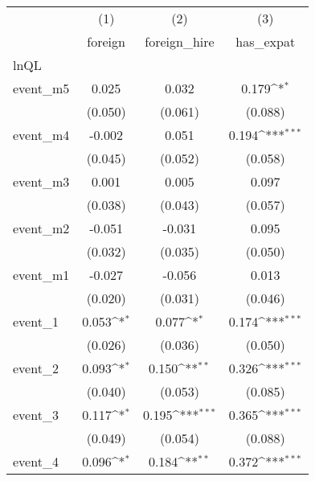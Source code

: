 {
\def\sym#1{\ifmmode^{#1}\else\(^{#1}\)\fi}
\begin{tabular}{l*{3}{c}}
\hline\hline
            &\multicolumn{1}{c}{(1)}&\multicolumn{1}{c}{(2)}&\multicolumn{1}{c}{(3)}\\
            &\multicolumn{1}{c}{foreign}&\multicolumn{1}{c}{foreign\_hire}&\multicolumn{1}{c}{has\_expat}\\
\hline
lnQL        &                     &                     &                     \\
event\_m5    &       0.025         &       0.032         &       0.179\sym{*}  \\
            &     (0.050)         &     (0.061)         &     (0.088)         \\
[1em]
event\_m4    &      -0.002         &       0.051         &       0.194\sym{***}\\
            &     (0.045)         &     (0.052)         &     (0.058)         \\
[1em]
event\_m3    &       0.001         &       0.005         &       0.097         \\
            &     (0.038)         &     (0.043)         &     (0.057)         \\
[1em]
event\_m2    &      -0.051         &      -0.031         &       0.095         \\
            &     (0.032)         &     (0.035)         &     (0.050)         \\
[1em]
event\_m1    &      -0.027         &      -0.056         &       0.013         \\
            &     (0.020)         &     (0.031)         &     (0.046)         \\
[1em]
event\_1     &       0.053\sym{*}  &       0.077\sym{*}  &       0.174\sym{***}\\
            &     (0.026)         &     (0.036)         &     (0.050)         \\
[1em]
event\_2     &       0.093\sym{*}  &       0.150\sym{**} &       0.326\sym{***}\\
            &     (0.040)         &     (0.053)         &     (0.085)         \\
[1em]
event\_3     &       0.117\sym{*}  &       0.195\sym{***}&       0.365\sym{***}\\
            &     (0.049)         &     (0.054)         &     (0.088)         \\
[1em]
event\_4     &       0.096\sym{*}  &       0.184\sym{**} &       0.372\sym{***}\\

\end{tabular}}
